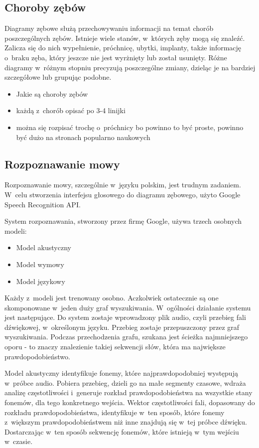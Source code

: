 \subsection{Choroby zębów}
Diagramy zębowe służą przechowywaniu informacji na temat chorób poszczególnych zębów. Istnieje wiele stanów, w~których zęby mogą się znaleźć. Zalicza się do nich wypełnienie, próchnicę, ubytki, implanty, także informację o~braku zęba, który jeszcze nie jest wyrżnięty lub został usunięty.\cite{teethDiseases} Różne diagramy w~różnym stopniu precyzują poszczególne zmiany, dzieląc je na bardziej szczegółowe lub grupując podobne.

\begin{itemize}
    \item Jakie są choroby zębów
    \item każdą z~chorób opisać po 3-4 linijki
    \item można się rozpisać trochę o~próchnicy bo powinno to być proste, powinno być dużo na stronach popularno naukowych
\end{itemize}

\subsection{Rozpoznawanie mowy}
Rozpoznawanie mowy, szczególnie w~języku polskim, jest trudnym zadaniem.\cite{cloudSpeechAPI} W~celu stworzenia interfejsu głosowego do diagramu zębowego, użyto Google Speech Recognition API.

System rozpoznawania, stworzony przez firmę Google, używa trzech osobnych modeli:
\begin{itemize}
    \item Model akustyczny
    \item Model wymowy
    \item Model językowy
\end{itemize}
Każdy z~modeli jest trenowany osobno. Aczkolwiek ostatecznie są one skomponowane w~jeden duży graf wyszukiwania. W~ogólności działanie systemu jest następujące. Do system zostaje wprowadzony plik audio, czyli przebieg fali dźwiękowej, w~określonym języku. Przebieg zostaje przepuszczony przez graf wyszukiwania. Podczas przechodzenia grafu, szukana jest ścieżka najmniejszego oporu - to znaczy znalezienie takiej sekwencji słów, która ma największe prawdopodobieństwo.

Model akustyczny identyfikuje fonemy, które najprawdopodobniej występują w~próbce audio. Pobiera przebieg, dzieli go na małe segmenty czasowe, wdraża analizę częstotliwości i~generuje rozkład prawdopodobieństwa na wszystkie stany fonemów, dla tego konkretnego wejścia. Wektor częstotliwości fali, dopasowany do rozkładu prawdopodobieństwa, identyfikuje w~ten sposób, które fonemy z~większym prawdopodobieństwem niż inne znajdują się w~tej próbce dźwięku. Dostarczając w~ten sposób sekwencję fonemów, które istnieją w~tym wejściu w~czasie.

